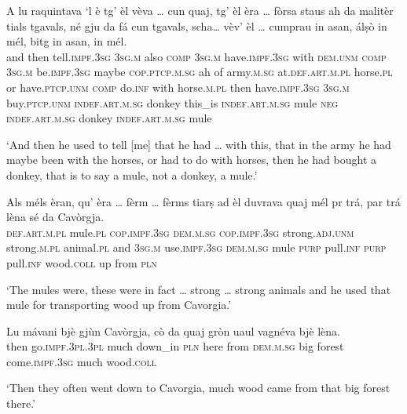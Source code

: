\begin{linenumbers}
\gll A lu raquintava `l è tg’ èl vèva … cun quaj, tg' èl èra … fòrsa staus ah da malitèr tials tgavals, né gju da fá cun tgavals, scha… vèv’ èl … cumprau in asan, álṣò in mél, bitg in asan, in mél.   \\
and then tell.\textsc{impf.3sg} \textsc{3sg.m} also \textsc{comp} \textsc{3sg.m} have.\textsc{impf.3sg} {} with \textsc{dem.unm} \textsc{comp} \textsc{3sg.m} be.\textsc{impf.3sg} {} maybe \textsc{cop.ptcp.m.sg} ah  of army.\textsc{m.sg} at.\textsc{def.art.m.pl} horse.\textsc{pl} or have.\textsc{ptcp.unm}  \textsc{comp} do.\textsc{inf} with horse.\textsc{m.pl} then have.\textsc{impf.3sg} \textsc{3sg.m} {}  buy.\textsc{ptcp.unm}  \textsc{indef.art.m.sg} donkey this\_is \textsc{indef.art.m.sg} mule \textsc{neg} \textsc{indef.art.m.sg} donkey \textsc{indef.art.m.sg} mule \\
\end{linenumbers}
\medskip
\glt `And then he used to tell [me] that he had … with this, that in the army he had maybe been with the horses, or had to do with horses, then he had bought a donkey, that is to say a mule, not a donkey, a mule.'
\medskip

\begin{linenumbers}
\gll Als méls èran, qu’ èra … fèrm … fèrms tiarṣ ad èl duvrava quaj mél pr trá, par trá lèna sé da Cavòrgja.   \\
 \textsc{def.art.m.pl} mule.\textsc{pl} \textsc{cop.impf.3sg} \textsc{dem.m.sg} \textsc{cop.impf.3sg} {} strong.\textsc{adj.unm} {} strong.\textsc{m.pl} animal.\textsc{pl} and \textsc{3sg.m} use.\textsc{impf.3sg} \textsc{dem.m.sg} mule \textsc{purp} pull.\textsc{inf} \textsc{purp} pull.\textsc{inf} wood.\textsc{coll} up from \textsc{pln}  \\
\end{linenumbers}
\medskip
\glt `The mules were, these were in fact … strong … strong animals and he used that mule for transporting wood up from Cavorgia.'
\medskip

\begin{linenumbers}
\gll  Lu mávani bjè gjùn Cavòrgja, cò da quaj gròn uaul\footnotemark{} vagnéva bjè lèna.\\
then go.\textsc{impf.3pl.3pl} much down\_in \textsc{pln} here from \textsc{dem.m.sg} big forest come.\textsc{impf.3sg} much wood.\textsc{coll}  \\
\end{linenumbers}
\medskip
\glt `Then they often went down to Cavorgia, much wood came from that big forest there.'
\medskip

